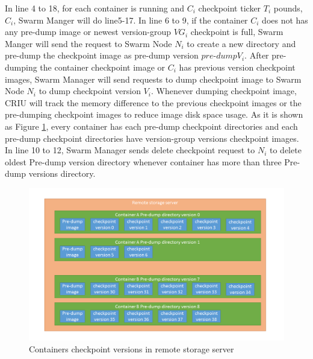 In line 4 to 18, for each container is running and $C_i$ checkpoint ticker $T_i$ pounds, $C_i$, Swarm Manger will do line5-17.
In line 6 to 9, if the container $C_i$ does not has any pre-dump image or newest version-group $VG_i$ checkpoint is full, Swarm Manger will send the request to Swarm Node $N_i$ to create a new directory and pre-dump the checkpoint image as pre-dump version $pre$-$dump V_i$.
After pre-dumping the container checkpoint image or $C_i$ has previous version checkpoint images, Swarm Manager will send requests to dump checkpoint image to Swarm Node $N_i$ to dump checkpoint version $V_i$. Whenever dumping checkpoint image, CRIU will track the memory difference to the previous checkpoint images or the pre-dumping checkpoint images to reduce image disk space usage. As it is shown as Figure \ref{fig:Containers checkpoint versions in remote storage server}, every container has each pre-dump checkpoint directories and each pre-dump checkpoint directories have version-group versions checkpoint images.
In line 10 to 12, Swarm Manager sends delete checkpoint request to $N_i$ to delete oldest Pre-dump version directory whenever container has more than three Pre-dump versions directory. 

\begin{figure}[h]
\begin{center}
\includegraphics[width=15cm]{figure/checkpoint_demo.png}
\end{center}
\caption{Containers checkpoint versions in remote storage server}
\label{fig:Containers checkpoint versions in remote storage server}
\end{figure}

